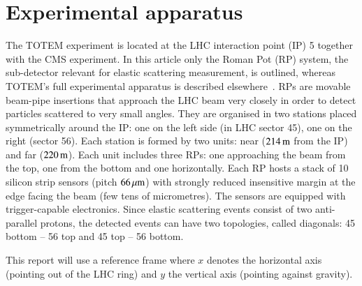 \section{Experimental apparatus}

The TOTEM experiment is located at the LHC interaction point (IP) 5 together 
with the CMS experiment. In this article only the Roman Pot (RP) system, the 
sub-detector relevant for elastic scattering measurement, is outlined, 
whereas TOTEM's full experimental apparatus is described %
elsewhere~\cite{totem-jinst}. 
RPs are movable beam-pipe
insertions that approach the LHC beam very closely in order to detect particles scattered to very small angles. They are organised in two stations placed symmetrically around the IP: one on the left side (in LHC sector 45), one on the right (sector 56). Each station is formed by two units: near ($214\,{\rm m}$ from the IP) and far ($220\,{\rm m}$). Each unit includes three RPs: one approaching the beam from the top, one from the bottom and one horizontally. Each RP hosts a stack of 10 silicon strip sensors (pitch $66\,{\rm \mu m}$) with strongly reduced insensitive margin at the edge facing the beam (few tens of micrometres). The sensors are equipped with trigger-capable electronics. Since elastic scattering events consist of two anti-parallel protons, the detected events can have two topologies, called diagonals: 45 bottom -- 56 top and 45 top -- 56 bottom.

This report will use a reference frame where $x$ denotes the horizontal axis (pointing out of the LHC ring) and $y$ the vertical axis (pointing against gravity).
